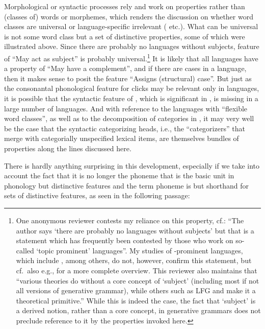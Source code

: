 \documentclass[output=paper]{langsci/langscibook}
\begin{document}
Morphological or syntactic processes rely and work on properties rather than
(classes of) words or morphemes, which renders the discussion on whether word
classes are universal or language-specific irrelevant
(\citealt{Hengeveld1992,Croft2005,Haspelmath2012} etc.). What can be universal
is not some word class but a set of distinctive properties, some of which were
illustrated above. Since there are probably no languages without subjects,
 feature of \enquote{May act as subject} is probably
universal.\footnote{One anonymous reviewer contests my reliance on this
    property, cf.: \enquote{The author says ‘there are probably no languages
        without subjects’ but that is a statement which has frequently been
    contested by those who work on so-called ‘topic prominent’ languages}. My
    studies of -prominent languages, which include , among
    others, do not, however, confirm this statement, but cf.\ also e.g.,
    \citet{EKiss2002} for a more complete overview. This reviewer also
    maintains that \enquote{various theories do without a core concept of
        \enquote{subject} (including most if not all versions of generative
        grammar), while others such as \gls{LFG}
        and  make it a
theoretical primitive.} While this is indeed the case, the fact that `subject’
is a derived notion, rather than a core concept, in generative grammars does
not preclude reference to it by the properties invoked here.} It is likely that
all languages have a property of \enquote{May have a complement}, and if there
are cases in a language, then it makes sense to posit the feature
\enquote{Assigns (structural) case}. But just as the consonantal phonological
feature for clicks may be relevant only in  languages, it is possible that
the syntactic feature of , which is significant in
, is
missing in a large number of languages. And with reference to the languages
with \enquote{flexible word classes}, as well as to the decomposition of
categories in , it may very
well be the case that the syntactic categorizing heads, i.e., the
\enquote{categorizers} that merge with categorially unspecified lexical items,
are themselves bundles of properties along the lines discussed here.

There is hardly anything surprising in this development, especially if we take
into account the fact that it is no longer the phoneme that is the basic unit
in phonology but distinctive features and the term phoneme is but shorthand for
sets of distinctive features, as seen in the following passage:\largerpage
\end{document}
